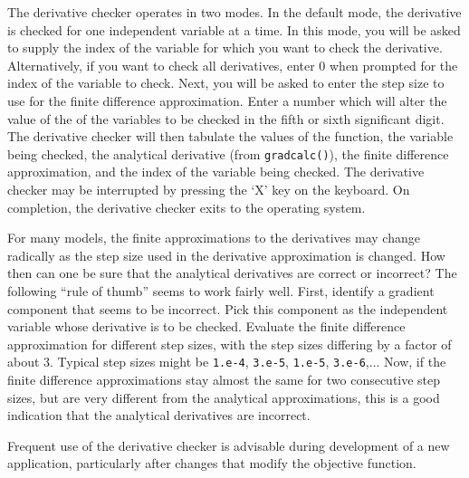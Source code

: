 \documentclass{admbmanual}
\begin{document}
The derivative checker operates in two modes. In 
the default mode, the derivative is checked for one independent variable 
at a time. In this mode, you will be
asked to supply the index of the variable for which you want to check
the derivative. 
Alternatively, if you want to check all derivatives, enter $0$ when
prompted for the index of the variable to check. Next,
you will be asked to enter the step size to use for the finite difference
approximation. 
Enter a number which will alter the value of the of the variables
to be checked in the fifth or sixth significant digit. 
The derivative checker will
then tabulate the values of the function, the variable being checked,
the analytical derivative (from \texttt{gradcalc()}), the finite difference
approximation, and the index of the variable being checked.
The derivative checker may be interrupted by pressing the `X'
key on the keyboard. On completion, the derivative checker exits to
the operating system. 

For many models, the finite approximations to the derivatives may
change radically as the step size used in the derivative approximation 
is changed. How then can one be sure that the analytical derivatives 
are correct or incorrect? The following ``rule of thumb'' seems to
work fairly well. First, identify a gradient component that seems
to be incorrect. Pick this component as the independent variable
whose derivative is to be checked. Evaluate the finite difference
approximation for different step sizes, with the step sizes
differing by a factor of about 3. Typical step sizes might be
\texttt{1.e-4}, \texttt{3.e-5}, \texttt{1.e-5}, \texttt{3.e-6},$\ldots$ Now, if the finite difference
approximations stay almost the same for two consecutive step sizes,
but are very different from the analytical approximations, this is
a good indication that the analytical derivatives are incorrect.

Frequent use of the derivative checker is advisable during development of a new application, particularly after changes that modify the objective function.
\end{document}
